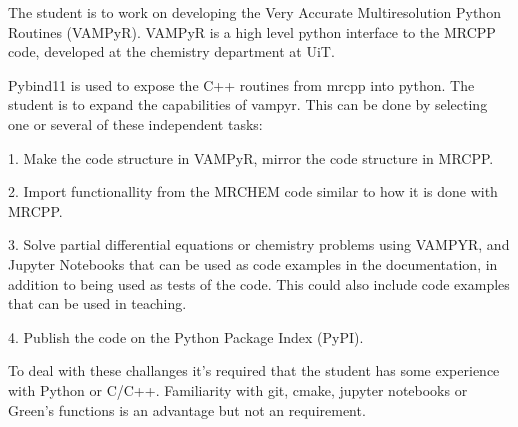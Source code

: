 \documentclass[12pt]{article}
\begin{document}
The student is to work on developing the Very Accurate Multiresolution
Python Routines (VAMPyR). VAMPyR is a high level python interface to
the MRCPP code, developed at the chemistry department at UiT.

Pybind11 is used to expose the C++ routines from mrcpp into python.
The student is to expand the capabilities of vampyr. This can be
done by selecting one or several of these independent tasks:

1. Make the code structure in VAMPyR, mirror the code structure
   in MRCPP.

2. Import functionallity from the MRCHEM code similar to how it is
   done with MRCPP.

3. Solve partial differential equations or chemistry problems using VAMPYR,
   and Jupyter Notebooks that can be used as code examples in the
   documentation, in addition to being used as tests of the code.
   This could also include code examples that can be used in
   teaching.

4. Publish the code on the Python Package Index (PyPI).

To deal with these challanges it's required that the student
has some experience with Python or C/C++. Familiarity with
git, cmake, jupyter notebooks or Green's functions is an advantage but not
an requirement.
\end{document}
